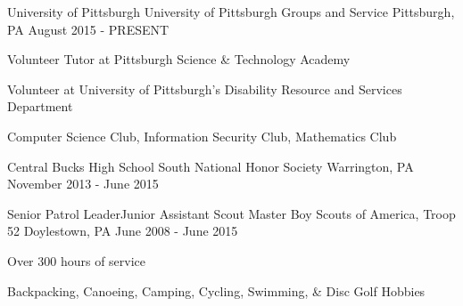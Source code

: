 
\vspace{-1mm}
\begin{cventries}

  \cventry
    {University of Pittsburgh} %
    {University of Pittsburgh Groups and Service} %
    {Pittsburgh, PA} %
    {August 2015 - PRESENT} %
    {
      \begin{cvitems} %
        \item {Volunteer Tutor at Pittsburgh Science \& Technology Academy}
        \item {Volunteer at University of Pittsburgh’s Disability Resource and Services Department}
        \item {Computer Science Club, Information Security Club, Mathematics Club}
      \end{cvitems}
    }

  \cventrywork
    {Central Bucks High School South} %
    {National Honor Society} %
    {Warrington, PA} %
    {November 2013 - June 2015} %

  \vspace{1mm}

  \cventry
    {Senior Patrol Leader{\enskip\cdotp\enskip}Junior Assistant Scout Master} %
    {Boy Scouts of America, Troop 52} %
    {Doylestown, PA} %
    {June 2008 - June 2015} %
    {
      \begin{cvitems} %
        \item {Over 300 hours of service}
      \end{cvitems}
    }

  \vspace{1mm}

  \cventrywork
    {Backpacking, Canoeing, Camping, Cycling, Swimming, \& Disc Golf} %
    {Hobbies} %
    {} %
    {} %

  \vspace{-5mm}

\end{cventries}
